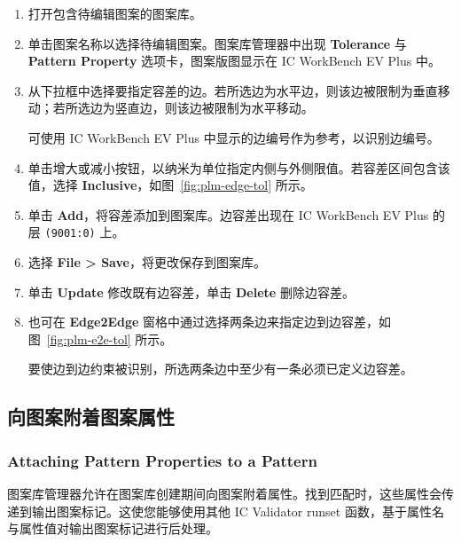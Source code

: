 \begin{enumerate}
  \item 打开包含待编辑图案的图案库。
  \item 单击图案名称以选择待编辑图案。图案库管理器中出现 \textbf{Tolerance} 与 \textbf{Pattern Property} 选项卡，图案版图显示在 IC WorkBench EV Plus 中。
  \item 从下拉框中选择要指定容差的边。若所选边为水平边，则该边被限制为垂直移动；若所选边为竖直边，则该边被限制为水平移动。

\begin{noteBox}
可使用 IC WorkBench EV Plus 中显示的边编号作为参考，以识别边编号。
\end{noteBox}

  \item 单击增大或减小按钮，以纳米为单位指定内侧与外侧限值。若容差区间包含该值，选择 \textbf{Inclusive}，如图~\ref{fig:plm-edge-tol} 所示。


  \item 单击 \textbf{Add}，将容差添加到图案库。边容差出现在 IC WorkBench EV Plus 的层 \texttt{(9001:0)} 上。
  \item 选择 \textbf{File > Save}，将更改保存到图案库。
  \item 单击 \textbf{Update} 修改既有边容差，单击 \textbf{Delete} 删除边容差。
  \item 也可在 \textbf{Edge2Edge} 窗格中通过选择两条边来指定边到边容差，如图~\ref{fig:plm-e2e-tol} 所示。


\begin{noteBox}
要使边到边约束被识别，所选两条边中至少有一条必须已定义边容差。
\end{noteBox}
\end{enumerate}

\subsection{向图案附着图案属性}
\subsubsection*{Attaching Pattern Properties to a Pattern}

图案库管理器允许在图案库创建期间向图案附着属性。找到匹配时，这些属性会传递到输出图案标记。这使您能够使用其他 IC Validator runset 函数，基于属性名与属性值对输出图案标记进行后处理。


